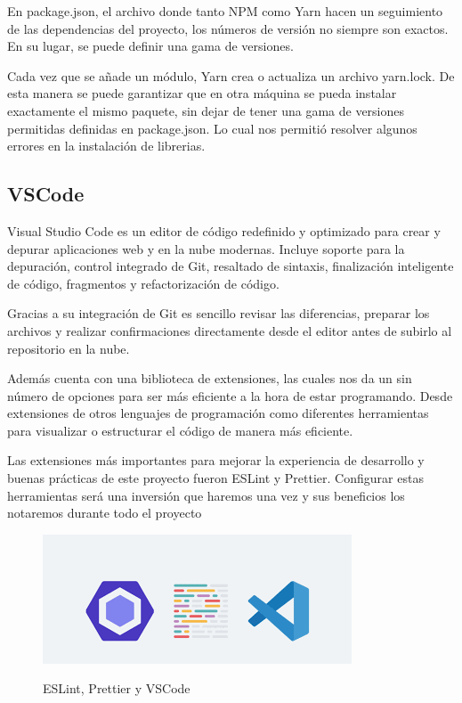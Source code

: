 \documentclass[12pt,twoside,titlepage]{report}
\begin{document}
En package.json, el archivo donde tanto NPM como Yarn hacen un seguimiento de las dependencias del proyecto, los números de versión no siempre son exactos. En su lugar, se puede definir una gama de versiones.

Cada vez que se añade un módulo, Yarn crea o actualiza un archivo yarn.lock.
De esta manera se puede garantizar que en otra máquina se pueda instalar exactamente el mismo paquete, sin dejar de tener una gama de versiones permitidas definidas en package.json. 
Lo cual nos permitió resolver algunos errores en la instalación de librerias.

\subsection{VSCode}

Visual Studio Code es un editor de código redefinido y optimizado para crear y depurar aplicaciones web y en la nube modernas. Incluye soporte para la depuración, control integrado de Git, resaltado de sintaxis, finalización inteligente de código, fragmentos y refactorización de código.

Gracias a su integración de Git es sencillo revisar las diferencias, preparar los archivos y realizar confirmaciones directamente desde el editor antes de subirlo al repositorio en la nube.

Además cuenta con una biblioteca de extensiones, las cuales nos da un sin número de opciones para ser más eficiente a la hora de estar programando. Desde extensiones de otros lenguajes de programación como diferentes herramientas para visualizar o estructurar el código de manera más eficiente.

Las extensiones más importantes para mejorar la experiencia de desarrollo y buenas prácticas de este proyecto fueron ESLint y Prettier. Configurar estas herramientas será una inversión que haremos una vez y sus beneficios los notaremos durante todo el proyecto

\begin{figure}[H]
    \centering
    \includegraphics[scale=0.8]{VSCode/VScodeExtensions}
    \label{fig:VScode_extensions}
    \caption{ESLint, Prettier y VSCode}
\end{figure}
\end{document}
